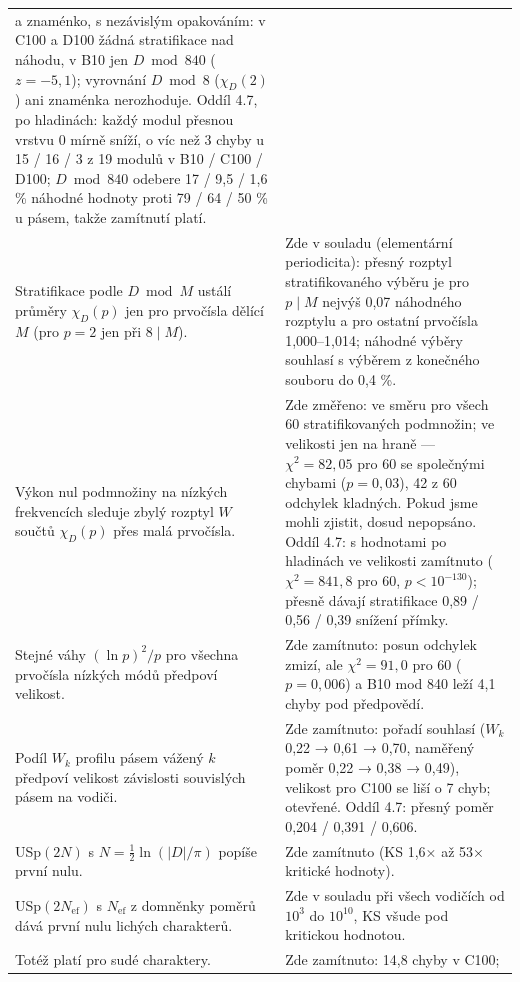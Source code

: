 \documentclass[
  10pt,
]{article}
\begin{document}
{\begin{longtable}[]{@{}
  >{\raggedright\arraybackslash}p{}
  >{\raggedright\arraybackslash}p{}@{}}
a znaménko, s nezávislým opakováním: v C100 a D100 žádná stratifikace
nad náhodu, v B10 jen \(D \bmod 840\) (\(z = -5{,}1\)); vyrovnání
\(D \bmod 8\) (\(\chi_D(2)\)) ani znaménka nerozhoduje. Oddíl 4.7, po
hladinách: každý modul přesnou vrstvu 0 mírně sníží, o víc než 3 chyby u
15 / 16 / 3 z 19 modulů v B10 / C100 / D100; \(D \bmod 840\) odebere 17
/ 9,5 / 1,6 \% náhodné hodnoty proti 79 / 64 / 50 \% u pásem, takže
zamítnutí platí. \\ \addlinespace[2pt]
Stratifikace podle \(D \bmod M\) ustálí průměry \(\chi_D(p)\) jen pro
prvočísla dělící \(M\) (pro \(p = 2\) jen při \(8 \mid M\)). & Zde v
souladu (elementární periodicita): přesný rozptyl stratifikovaného
výběru je pro \(p \mid M\) nejvýš 0,07 náhodného rozptylu a pro ostatní
prvočísla 1,000--1,014; náhodné výběry souhlasí s výběrem z konečného
souboru do 0,4 \%. \\ \addlinespace[2pt]
Výkon nul podmnožiny na nízkých frekvencích sleduje zbylý rozptyl \(W\)
součtů \(\chi_D(p)\) přes malá prvočísla. & Zde změřeno: ve směru pro
všech 60 stratifikovaných podmnožin; ve velikosti jen na hraně ---
\(\chi^2 = 82{,}05\) pro 60 se společnými chybami (\(p = 0{,}03\)), 42 z
60 odchylek kladných. Pokud jsme mohli zjistit, dosud nepopsáno. Oddíl
4.7: s hodnotami po hladinách ve velikosti zamítnuto
(\(\chi^2 = 841{,}8\) pro 60, \(p < 10^{-130}\)); přesně dávají
stratifikace 0,89 / 0,56 / 0,39 snížení přímky. \\ \addlinespace[2pt]
Stejné váhy \((\ln p)^2/p\) pro všechna prvočísla nízkých módů předpoví
velikost. & Zde zamítnuto: posun odchylek zmizí, ale \(\chi^2 = 91{,}0\)
pro 60 (\(p = 0{,}006\)) a B10 mod 840 leží 4,1 chyby pod předpovědí. \\ \addlinespace[2pt]
Podíl \(W_k\) profilu pásem vážený \(k\) předpoví velikost závislosti
souvislých pásem na vodiči. & Zde zamítnuto: pořadí souhlasí (\(W_k\)
0,22 → 0,61 → 0,70, naměřený poměr 0,22 → 0,38 → 0,49), velikost pro
C100 se liší o 7 chyb; otevřené. Oddíl 4.7: přesný poměr 0,204 / 0,391 /
0,606. \\ \addlinespace[2pt]
USp\((2N)\) s \(N = \frac12\ln(|D|/\pi)\) popíše první nulu. & Zde
zamítnuto (KS 1,6× až 53× kritické hodnoty). \\ \addlinespace[2pt]
USp\((2N_{\mathrm{ef}})\) s \(N_{\mathrm{ef}}\) z domněnky poměrů dává
první nulu lichých charakterů. & Zde v souladu při všech vodičích od
\(10^3\) do \(10^{10}\), KS všude pod kritickou hodnotou. \\ \addlinespace[2pt]
Totéž platí pro sudé charaktery. & Zde zamítnuto: 14,8 chyby v C100;

\end{longtable}}
\end{document}
